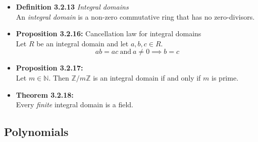 \documentclass[11pt,a4paper]{article}
\begin{document}
\begin{itemize}
    \item \textbf{Definition 3.2.13} \emph{Integral domains} \\
        An \emph{integral domain} is a non-zero commutative ring that has no zero-divisors.

    \item \textbf{Proposition 3.2.16:} Cancellation law for integral domains \\
        Let $R$ be an integral domain and let $a,b,c \in R$.
        \[
            ab = ac \ \text{and} \ a \neq 0 \implies b = c
        \]

    \item \textbf{Proposition 3.2.17:} \\
        Let $m \in \mathbb{N}$.
        Then $\mathbb{Z}/m\mathbb{Z}$ is an integral domain if and only if $m$ is prime.

    \item \textbf{Theorem 3.2.18:} \\
        Every \emph{finite} integral domain is a field.
\end{itemize}

\subsection{Polynomials}
\end{document}
